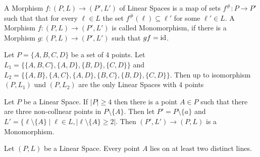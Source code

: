 \begin{Def}
A Morphism \(f\colon (P,L)\to (P',L')\) of Linear Spaces is a map of sets 
\(f^\#\colon P\to P'\) such that that for every \(\ell\in L\) the set 
\(f^\#(\ell)\subseteq \ell'\) for some \(\ell'\in L\).
A Morphism \(f\colon (P,L)\to (P',L')\) is called Monomorphism, if there is a Morphism
\(g\colon (P,L)\to (P',L')\) such that \(gf=\mathrm{id}\).
\end{Def}
\begin{Bsp}
Let \(P=\{A,B,C,D\}\) be a set of 4 points. 
Let \(L_1=\{\{A,B,C\},\{A,D\},\{B,D\},\{C,D\}\}\) and 
\(L_2=\{\{A,B\},\{A,C\},\{A,D\},\{B,C\},\{B,D\},\{C,D\}\}\). 
Then up to isomorphism \((P,L_1)\) und \((P,L_2)\) are the only Linear Spaces with 4 points
\begin{figure}[H]
    \centering
    
\end{figure}
\end{Bsp}
\begin{Bsp}
Let \(P\) be a Linear Space. If 
\(|P|\geq 4\) then there is a point \(A\in P\) such that there are three non-collnear points 
in \(P\setminus\{A\}\).
Then let \(P'=P\setminus\{a\}\) and \(L'=\{\ell\setminus\{A\}\mid \ell\in L, |\ell\setminus\{A\}\geq 2|\).
Then \((P',L')\to (P,L)\) is a Monomorphism.

\end{Bsp}
\begin{Satz}\label{Satz:PointOnTwoLine}
Let \((P,L)\) be a Linear Space.
Every point \(A\) lies on at least two distinct lines.
\end{Satz}
